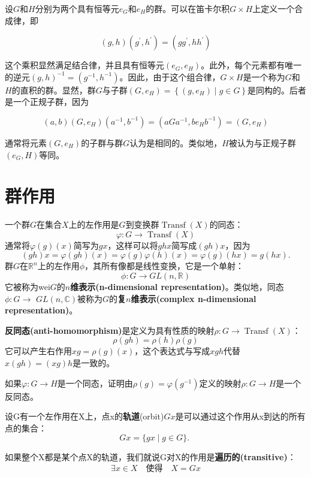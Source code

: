 \begin{eg}
设$G$和$H$分别为两个具有恒等元$e_{G}$和$e_{H}$的群。可以在笛卡尔积$G \times H$上定义一个合成律，即

$$
(g, h)\left(g^{\prime}, h^{\prime}\right)=\left(g g^{\prime}, h h^{\prime}\right)
$$

这个乘积显然满足结合律，并且具有恒等元$\left(e_{G}, e_{H}\right)$。此外，每个元素都有唯一的逆元$(g, h)^{-1}=\left(g^{-1}, h^{-1}\right)$。因此，由于这个组合律，$G \times H$是一个称为$G$和$H$的直积的群。显然，群$G$与子群$\left(G, e_{H}\right)=\left\{\left(g, e_{H}\right) \mid g \in G\right\}$是同构的。后者是一个正规子群，因为

$$
(a, b)\left(G, e_{H}\right)\left(a^{-1}, b^{-1}\right)=\left(a G a^{-1}, b e_{H} b^{-1}\right)=\left(G, e_{H}\right)
$$

通常将元素$\left(G, e_{H}\right)$的子群与群$G$认为是相同的。类似地，$H$被认为与正规子群$\left(e_{G}, H\right)$等同。
\end{eg}
\section{群作用}\label{sec:2.6}
一个群$G$在集合$X$上的左作用是$G$到变换群$\operatorname{Transf}(X)$的同态：
$$
\varphi: G \rightarrow \operatorname{Transf}(X)
$$
通常将$\varphi(g)(x)$简写为$g x$，这样可以将$g h x$简写成$(g h) x$，因为
$$
(g h) x=\varphi(g h)(x)=\varphi(g) \varphi(h)(x)=\varphi(g)(h x)=g(h x) .
$$
群$G$在$\mathbb{R}^{n}$上的左作用$\phi$，其所有像都是线性变换，它是一个单射：
$$
\phi: G \rightarrow G L(n, \mathbb{R})
$$
它被称为wei$G$的\textbf{$n$维表示(n-dimensional representation)}。类似地，同态$\phi: G \rightarrow$ $G L(n, \mathbb{C})$被称为$G$的\textbf{复$n$维表示(complex n-dimensional representation)}。

\textbf{反同态(anti-homomorphism)}是定义为具有性质的映射$\rho: G \rightarrow \operatorname{Transf}(X)$：
$$
\rho(g h)=\rho(h) \rho(g)
$$
它可以产生右作用$x g=\rho(g)(x)$，这个表达式与写成$x g h$代替$x(g h)=(x g) h$是一致的。
\begin{exercise}
    如果$\varphi: G \rightarrow H$是一个同态，证明由$\rho(g)=\varphi\left(g^{-1}\right)$定义的映射$\rho: G \rightarrow H$是一个反同态。 

\end{exercise}
设G有一个左作用在X上，点x的\textbf{轨道}(orbit)$G x$是可以通过这个作用从x到达的所有点的集合： 
$$
G x=\{g x \mid g \in G\} \text {. }
$$ 

如果整个X都是某个点X的轨道，我们就说G对X的作用是\textbf{遍历的(transitive)}： 
$$
\exists x \in X \quad \text {使得} \quad X=G x
$$ 

